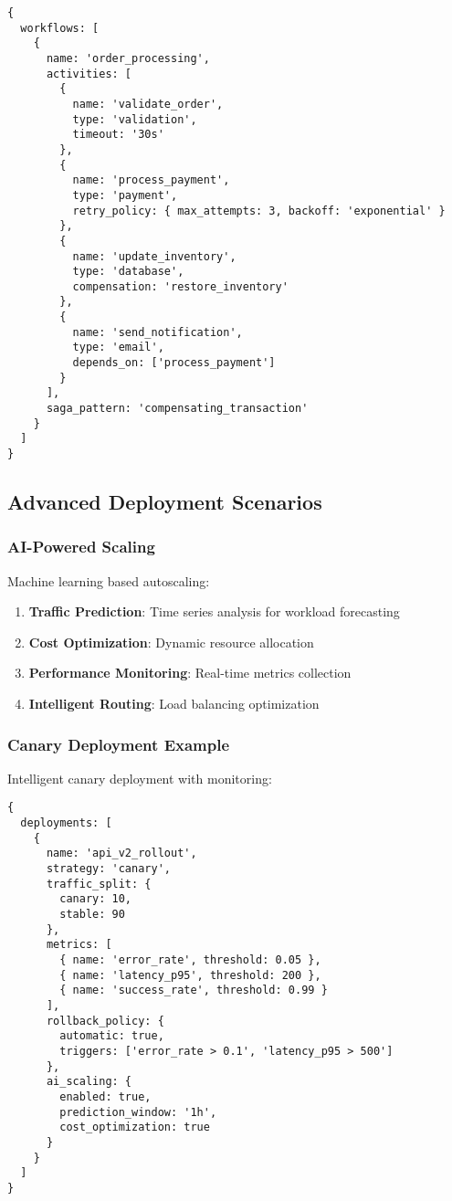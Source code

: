 \documentclass[11pt,a4paper]{article}
\begin{document}
\begin{lstlisting}[language=jsonnet,caption=E-commerce Workflow]
{
  workflows: [
    {
      name: 'order_processing',
      activities: [
        {
          name: 'validate_order',
          type: 'validation',
          timeout: '30s'
        },
        {
          name: 'process_payment',
          type: 'payment',
          retry_policy: { max_attempts: 3, backoff: 'exponential' }
        },
        {
          name: 'update_inventory',
          type: 'database',
          compensation: 'restore_inventory'
        },
        {
          name: 'send_notification',
          type: 'email',
          depends_on: ['process_payment']
        }
      ],
      saga_pattern: 'compensating_transaction'
    }
  ]
}
\end{lstlisting}

\subsection{Advanced Deployment Scenarios}
\label{subsec:deployment_scenarios}

\subsubsection{AI-Powered Scaling}
\label{subsubsec:ai_scaling}

Machine learning based autoscaling:

\begin{enumerate}
\item \textbf{Traffic Prediction}: Time series analysis for workload forecasting
\item \textbf{Cost Optimization}: Dynamic resource allocation
\item \textbf{Performance Monitoring}: Real-time metrics collection
\item \textbf{Intelligent Routing}: Load balancing optimization
\end{enumerate}

\subsubsection{Canary Deployment Example}
\label{subsubsec:canary_example}

Intelligent canary deployment with monitoring:

\begin{lstlisting}[language=jsonnet,caption=Canary Deployment]
{
  deployments: [
    {
      name: 'api_v2_rollout',
      strategy: 'canary',
      traffic_split: {
        canary: 10,
        stable: 90
      },
      metrics: [
        { name: 'error_rate', threshold: 0.05 },
        { name: 'latency_p95', threshold: 200 },
        { name: 'success_rate', threshold: 0.99 }
      ],
      rollback_policy: {
        automatic: true,
        triggers: ['error_rate > 0.1', 'latency_p95 > 500']
      },
      ai_scaling: {
        enabled: true,
        prediction_window: '1h',
        cost_optimization: true
      }
    }
  ]
}
\end{lstlisting}
\end{document}
